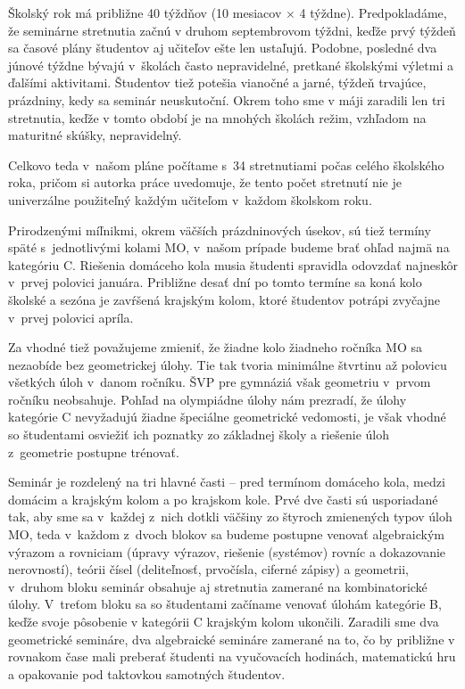 Školský rok má približne 40 týždňov (10 mesiacov $\times$ 4 týždne). Predpokladáme, že seminárne stretnutia začnú v druhom septembrovom týždni, keďže prvý týždeň sa časové plány študentov aj učiteľov ešte len ustaľujú. Podobne, posledné dva júnové týždne bývajú v~školách často nepravidelné, pretkané školskými výletmi a ďalšími aktivitami. Študentov tiež potešia vianočné a jarné, týždeň trvajúce, prázdniny, kedy sa seminár neuskutoční. Okrem toho sme v máji zaradili len tri stretnutia, keďže v tomto období je na mnohých školách režim, vzhľadom na maturitné skúšky, nepravidelný.

Celkovo teda v~našom pláne počítame s~34 stretnutiami počas celého školského roka, pričom si autorka práce uvedomuje, že tento počet stretnutí nie je univerzálne použiteľný každým učiteľom v~každom školskom roku.

Prirodzenými míľnikmi, okrem väčších prázdninových úsekov, sú tiež termíny späté s~jednotlivými kolami MO, v~našom prípade budeme brať ohľad najmä na kategóriu C. Riešenia domáceho kola musia študenti spravidla odovzdať najneskôr v~prvej polovici januára. Približne desať dní po tomto termíne sa koná kolo školské a sezóna je zavŕšená krajským kolom, ktoré študentov potrápi zvyčajne v~prvej polovici apríla.

Za vhodné tiež považujeme zmieniť, že žiadne kolo žiadneho ročníka MO sa nezaobíde bez geometrickej úlohy. Tie tak tvoria minimálne štvrtinu až polovicu všetkých úloh v~danom ročníku. ŠVP pre gymnáziá však geometriu v~prvom ročníku neobsahuje. Pohľad na olympiádne úlohy nám prezradí, že úlohy kategórie C nevyžadujú žiadne špeciálne geometrické vedomosti, je však vhodné so študentami osviežiť ich poznatky zo základnej školy a riešenie úloh z~geometrie postupne trénovať.

Seminár je rozdelený na tri hlavné časti -- pred termínom domáceho kola, medzi domácim a krajským kolom a po krajskom kole. Prvé dve časti sú usporiadané tak, aby sme sa v~každej z~nich dotkli väčšiny zo štyroch zmienených typov úloh MO, teda v~každom z~dvoch blokov sa budeme postupne venovať algebraickým výrazom a rovniciam (úpravy výrazov, riešenie (systémov) rovníc a dokazovanie nerovností), teórii čísel (deliteľnosť, prvočísla, ciferné zápisy) a geometrii, v~druhom bloku seminár obsahuje aj stretnutia zamerané na kombinatorické úlohy. V~treťom bloku sa so študentami začíname venovať úlohám kategórie B, keďže svoje pôsobenie v kategórii C krajským kolom ukončili. Zaradili sme dva geometrické semináre, dva algebraické semináre zamerané na to, čo by približne v rovnakom čase mali preberať študenti na vyučovacích hodinách, matematickú hru a opakovanie pod taktovkou samotných študentov.

